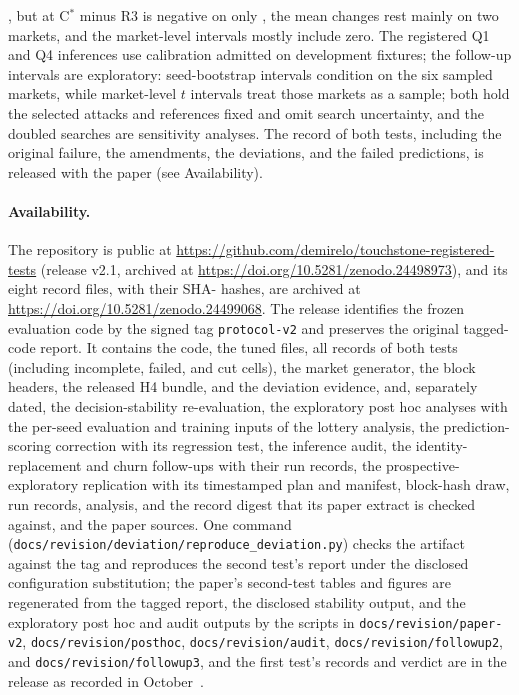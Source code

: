 \documentclass[11pt]{article}
\begin{document}
, but at  C$^*$ minus R3 is negative on only , the mean changes rest mainly on two markets, and the market-level intervals mostly include zero. The registered Q1 and Q4 inferences use calibration admitted on development fixtures; the follow-up intervals are exploratory: seed-bootstrap intervals condition on the six sampled markets, while market-level $t$ intervals treat those markets as a sample; both hold the selected attacks and references fixed and omit search uncertainty, and the doubled searches are sensitivity analyses. The record of both tests, including the original failure, the amendments, the deviations, and the failed predictions, is released with the paper (see Availability).

\paragraph{Availability.} The repository is public at \url{https://github.com/demirelo/touchstone-registered-tests} (release v2.1, archived at \url{https://doi.org/10.5281/zenodo.24498973}), and its eight record files, with their SHA- hashes, are archived at \url{https://doi.org/10.5281/zenodo.24499068}. The release identifies the frozen evaluation code by the signed tag \texttt{protocol-v2} and preserves the original tagged-code report. It contains the code, the tuned files, all records of both tests (including incomplete, failed, and cut cells), the market generator, the block headers, the released H4 bundle, and the deviation evidence, and, separately dated, the decision-stability re-evaluation, the exploratory post hoc analyses with the per-seed evaluation and training inputs of the lottery analysis, the prediction-scoring correction with its regression test, the inference audit, the identity-replacement and churn follow-ups with their run records, the prospective-exploratory replication with its timestamped plan and manifest, block-hash draw, run records, analysis, and the record digest that its paper extract is checked against, and the paper sources. One command (\texttt{docs/revision/deviation/reproduce\_deviation.py}) checks the artifact against the tag and reproduces the second test's report under the disclosed configuration substitution; the paper's second-test tables and figures are regenerated from the tagged report, the disclosed stability output, and the exploratory post hoc and audit outputs by the scripts in \texttt{docs/revision/paper-v2}, \texttt{docs/revision/posthoc}, \texttt{docs/revision/audit}, \texttt{docs/revision/followup2}, and \texttt{docs/revision/followup3}, and the first test's records and verdict are in the release as recorded in October~.
\end{document}
